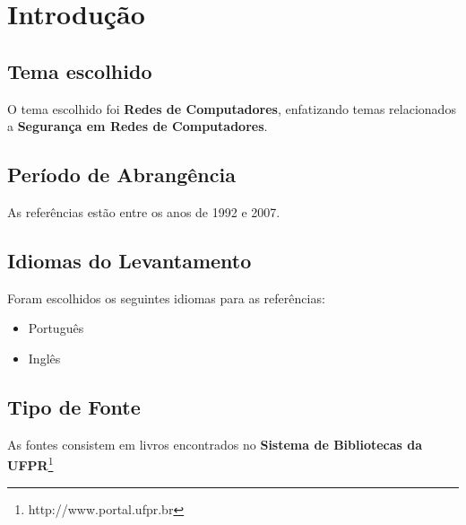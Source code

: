 \documentclass[notimes,pnumplain]{abnt}
\begin{document}
\folhaderosto

\chapter{Introdução}

\section{Tema escolhido}

O tema escolhido foi \textbf{Redes de Computadores}, enfatizando temas relacionados
a \textbf{Segurança em Redes de Computadores}.



\section{Período de Abrangência}

As referências estão entre os anos de 1992 e 2007.

\section{Idiomas do Levantamento}

Foram escolhidos os seguintes idiomas para as referências:

\begin{itemize}
	
	\item Português
	\item Inglês
	
\end{itemize}


\section{Tipo de Fonte}

As fontes consistem em livros encontrados no \textbf{Sistema de Bibliotecas da UFPR}\footnote{http://www.portal.ufpr.br}


\pagebreak






\end{document}
